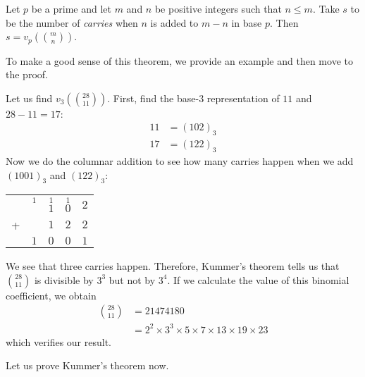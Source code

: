 \documentclass{subfile}
\begin{document}
\begin{theorem}
	Let $p$ be a prime and let $m$ and $n$ be positive integers such that $n \leq m$. Take $s$ to be the number of \textit{carries} when $n$ is added to $m-n$ in base $p$. Then $s = v_p\left( \binom{m}{n}\right)$.
\end{theorem}

To make a good sense of this theorem, we provide an example and then move to the proof.

\begin{example}
	Let us find $v_3\left( \binom{28}{11}\right)$. First, find the base-$3$ representation of $11$ and $28-11=17$:
	\begin{align*}
		11
		& = (102)_3\\
		17
		& = (122)_3
	\end{align*}
	Now we do the columnar addition to see how many carries happen when we add $(1001)_3$ and $(122)_3$:
	\begin{center}
		\begin{tabular}{c*{4}{@{\,}c}}
			&  $\overset{1}{\phantom{1}}$   & $\overset{1}{1}$ & $\overset{1}{0}$ & $2$\\
			+& 		& $1$				   & $2$ 			  	  & $2$\\ \hline
			& $1$	& $0$				   & $0$ 			      & $1$\\
		\end{tabular}
	\end{center}
	We see that three carries happen. Therefore, Kummer's theorem tells us that $\binom{28}{11}$ is divisible by $3^3$ but not by $3^4$. If we calculate the value of this binomial coefficient, we obtain
	\begin{align*}
		\binom{28}{11} &= 21474180\\
		&= 2^2 \times 3^3 \times 5 \times 7 \times 13 \times 19 \times 23
	\end{align*}
	which verifies our result.

	Let us prove Kummer's theorem now.

\end{example}
\end{document}
